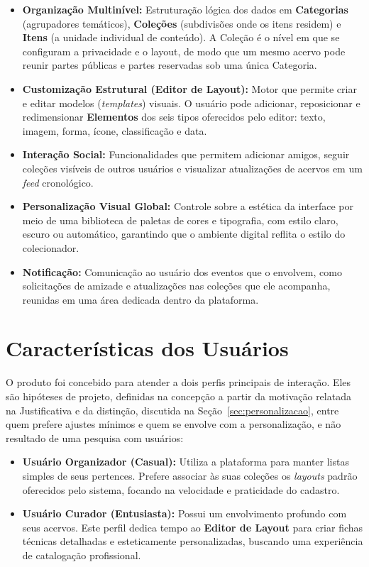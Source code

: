 \begin{itemize}
    \item \textbf{Organização Multinível:} Estruturação lógica dos dados em \textbf{Categorias} (agrupadores temáticos), \textbf{Coleções} (subdivisões onde os itens residem) e \textbf{Itens} (a unidade individual de conteúdo). A Coleção é o nível em que se configuram a privacidade e o layout, de modo que um mesmo acervo pode reunir partes públicas e partes reservadas sob uma única Categoria.
    \item \textbf{Customização Estrutural (Editor de Layout):} Motor que permite criar e editar modelos (\textit{templates}) visuais. O usuário pode adicionar, reposicionar e redimensionar \textbf{Elementos} dos seis tipos oferecidos pelo editor: texto, imagem, forma, ícone, classificação e data.
    \item \textbf{Interação Social:} Funcionalidades que permitem adicionar amigos, seguir coleções visíveis de outros usuários e visualizar atualizações de acervos em um \textit{feed} cronológico.
    \item \textbf{Personalização Visual Global:} Controle sobre a estética da interface por meio de uma biblioteca de paletas de cores e tipografia, com estilo claro, escuro ou automático, garantindo que o ambiente digital reflita o estilo do colecionador.
    \item \textbf{Notificação:} Comunicação ao usuário dos eventos que o envolvem, como solicitações de amizade e atualizações nas coleções que ele acompanha, reunidas em uma área dedicada dentro da plataforma.
\end{itemize}

\section{Características dos Usuários}

O produto foi concebido para atender a dois perfis principais de interação. Eles são hipóteses de projeto, definidas na concepção a partir da motivação relatada na Justificativa e da distinção, discutida na Seção~\ref{sec:personalizacao}, entre quem prefere ajustes mínimos e quem se envolve com a personalização, e não resultado de uma pesquisa com usuários:

\begin{itemize}
    \item \textbf{Usuário Organizador (Casual):} Utiliza a plataforma para manter listas simples de seus pertences. Prefere associar às suas coleções os \textit{layouts} padrão oferecidos pelo sistema, focando na velocidade e praticidade do cadastro.
    \item \textbf{Usuário Curador (Entusiasta):} Possui um envolvimento profundo com seus acervos. Este perfil dedica tempo ao \textbf{Editor de Layout} para criar fichas técnicas detalhadas e esteticamente personalizadas, buscando uma experiência de catalogação profissional.
\end{itemize}

